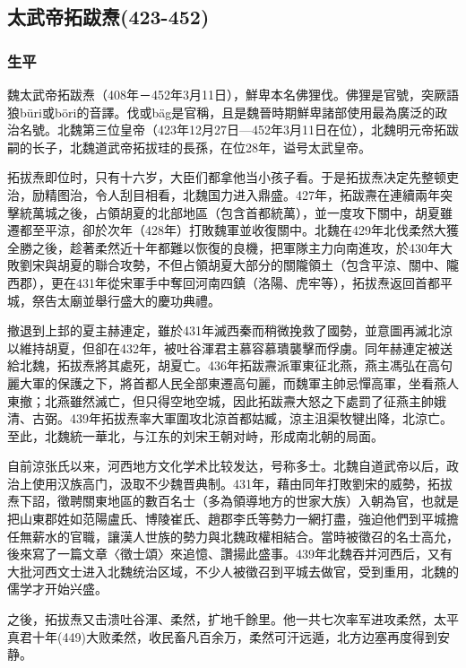 
\subsection{太武帝拓跋焘\tiny(423-452)}

\subsubsection{生平}

魏太武帝拓跋焘（408年－452年3月11日），鮮卑本名佛狸伐。佛狸是官號，突厥語狼büri或böri的音譯。伐或bäg是官稱，且是魏晉時期鮮卑諸部使用最為廣泛的政治名號。北魏第三位皇帝（423年12月27日—452年3月11日在位），北魏明元帝拓跋嗣的长子，北魏道武帝拓拔珪的長孫，在位28年，谥号太武皇帝。

拓拔焘即位时，只有十六岁，大臣们都拿他当小孩子看。于是拓拔焘决定先整顿吏治，励精图治，令人刮目相看，北魏国力进入鼎盛。427年，拓跋燾在連續兩年突擊統萬城之後，占領胡夏的北部地區（包含首都統萬），並一度攻下關中，胡夏雖遷都至平涼，卻於次年（428年）打敗魏軍並收復關中。北魏在429年北伐柔然大獲全勝之後，趁著柔然近十年都難以恢復的良機，把軍隊主力向南進攻，於430年大敗劉宋與胡夏的聯合攻勢，不但占領胡夏大部分的關隴領土（包含平涼、關中、隴西郡），更在431年從宋軍手中奪回河南四鎮（洛陽、虎牢等），拓拔焘返回首都平城，祭告太廟並舉行盛大的慶功典禮。

撤退到上邽的夏主赫連定，雖於431年滅西秦而稍微挽救了國勢，並意圖再滅北涼以維持胡夏，但卻在432年，被吐谷渾君主慕容慕璝襲擊而俘虜。同年赫連定被送給北魏，拓拔焘將其處死，胡夏亡。436年拓跋燾派軍東征北燕，燕主馮弘在高句麗大軍的保護之下，將首都人民全部東遷高句麗，而魏軍主帥忌憚高軍，坐看燕人東撤；北燕雖然滅亡，但只得空地空城，因此拓跋燾大怒之下處罰了征燕主帥娥清、古弼。439年拓拔焘率大軍圍攻北涼首都姑臧，涼主沮渠牧犍出降，北涼亡。至此，北魏統一華北，与江东的刘宋王朝对峙，形成南北朝的局面。

自前涼张氏以来，河西地方文化学术比较发达，号称多士。北魏自道武帝以后，政治上使用汉族高门，汲取不少魏晋典制。431年，藉由同年打敗劉宋的威勢，拓拔焘下詔，徵聘關東地區的數百名士（多為領導地方的世家大族）入朝為官，也就是把山東郡姓如范陽盧氏、博陵崔氏、趙郡李氏等勢力一網打盡，強迫他們到平城擔任無薪水的官職，讓漢人世族的勢力與北魏政權相結合。當時被徵召的名士高允，後來寫了一篇文章〈徵士頌〉來追憶、讚揚此盛事。439年北魏吞并河西后，又有大批河西文士进入北魏统治区域，不少人被徵召到平城去做官，受到重用，北魏的儒学才开始兴盛。

之後，拓拔焘又击溃吐谷渾、柔然，扩地千餘里。他一共七次率军进攻柔然，太平真君十年(449)大败柔然，收民畜凡百余万，柔然可汗远遁，北方边塞再度得到安静。

